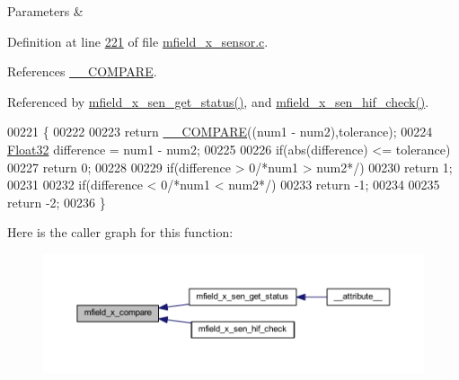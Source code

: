 \begin{DoxyParams}{Parameters}
{\em } & \\
\hline
\end{DoxyParams}


Definition at line \hyperlink{a00050_source_l00221}{221} of file \hyperlink{a00050_source}{mfield\+\_\+x\+\_\+sensor.\+c}.



References \hyperlink{a00021_source_l00023}{\+\_\+\+\_\+\+C\+O\+M\+P\+A\+R\+E}.



Referenced by \hyperlink{a00052_source_l00293}{mfield\+\_\+x\+\_\+sen\+\_\+get\+\_\+status()}, and \hyperlink{a00052_source_l00984}{mfield\+\_\+x\+\_\+sen\+\_\+hif\+\_\+check()}.


\begin{DoxyCode}
00221                                                                     \{
00222 
00223      \textcolor{keywordflow}{return} \hyperlink{a00021_a1aaf79017d1250538fff385827b7401e}{\_\_COMPARE}((num1 - num2),tolerance);
00224    \hyperlink{a00072_a87d38f886e617ced2698fc55afa07637}{Float32} difference = num1 - num2;
00225 
00226    \textcolor{keywordflow}{if}(abs(difference) <= tolerance)
00227     \textcolor{keywordflow}{return}  0;
00228 
00229    \textcolor{keywordflow}{if}(difference > 0\textcolor{comment}{/*num1 > num2*/})
00230     \textcolor{keywordflow}{return} 1;
00231 
00232    \textcolor{keywordflow}{if}(difference < 0\textcolor{comment}{/*num1 < num2*/})
00233     \textcolor{keywordflow}{return} -1;
00234 
00235    \textcolor{keywordflow}{return} -2;
00236 \}
\end{DoxyCode}


Here is the caller graph for this function\+:\nopagebreak
\begin{figure}[H]
\begin{center}
\leavevmode
\includegraphics[width=350pt]{d3/dfe/a00025_a44dbd44e6cfef004d281e632f3e3070d_icgraph}
\end{center}
\end{figure}


